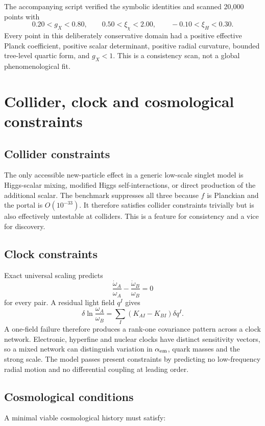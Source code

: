 \documentclass[11pt,a4paper]{article}
\begin{document}
The accompanying script verified the symbolic identities and scanned 20,000 points with
\[
0.20<g_X<0.80,
\qquad
0.50<\xi_\chi<2.00,
\qquad
-0.10<\xi_H<0.30.
\]
Every point in this deliberately conservative domain had a positive effective Planck coefficient, positive scalar determinant, positive radial curvature, bounded tree-level quartic form, and $g_X<1$. This is a consistency scan, not a global phenomenological fit.

\section{Collider, clock and cosmological constraints}

\subsection{Collider constraints}

The only accessible new-particle effect in a generic low-scale singlet model is Higgs-scalar mixing, modified Higgs self-interactions, or direct production of the additional scalar. The benchmark suppresses all three because $f$ is Planckian and the portal is $O(10^{-33})$. It therefore satisfies collider constraints trivially but is also effectively untestable at colliders. This is a feature for consistency and a vice for discovery.

\subsection{Clock constraints}

Exact universal scaling predicts
\[
\frac{\dot\omega_A}{\omega_A}-
\frac{\dot\omega_B}{\omega_B}=0
\]
for every pair. A residual light field $q^I$ gives
\[
\delta\ln\frac{\omega_A}{\omega_B}
=\sum_I(K_{AI}-K_{BI})\delta q^I.
\]
A one-field failure therefore produces a rank-one covariance pattern across a clock network. Electronic, hyperfine and nuclear clocks have distinct sensitivity vectors, so a mixed network can distinguish variation in $\alpha_{\rm em}$, quark masses and the strong scale. The model passes present constraints by predicting no low-frequency radial motion and no differential coupling at leading order.

\subsection{Cosmological conditions}

A minimal viable cosmological history must satisfy:
\end{document}
